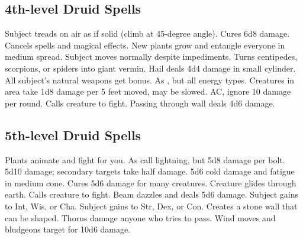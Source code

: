 \subsection{4th-level Druid Spells}
\begin{spelllist}
   Subject treads on air as if solid (climb at 45-degree angle).
   Cures 6d8 damage.
   Cancels spells and magical effects.
   New plants grow and entangle everyone in medium spread.
   Subject moves normally despite impediments.
   Turns centipedes, scorpions, or spiders into giant vermin.
   Hail deals 4d4 damage in small cylinder.
   All subject's natural weapons get  bonus.
   As , but all energy types.
   Creatures in area take 1d8 damage per 5 feet moved, may be slowed.
    AC, ignore 10 damage per round.
   Calls creature to fight.
   Passing through wall deals 4d6 damage.
\end{spelllist}

\subsection{5th-level Druid Spells}
\begin{spelllist}
   Plants animate and fight for you.
   As call lightning, but 5d8 damage per bolt.
   5d10 damage; secondary targets take half damage.
   5d6 cold damage and fatigue in medium cone.
   Cures 5d6 damage for many creatures.
   Creature glides through earth. 
   Calls creature to fight.
   Beam dazzles and deals 5d6 damage.
   Subject gains  to Int, Wis, or Cha.
   Subject gains  to Str, Dex, or Con.
   Creates a stone wall that can be shaped.
   Thorns damage anyone who tries to pass.
   Wind moves and bludgeons target for 10d6 damage.
\end{spelllist}

